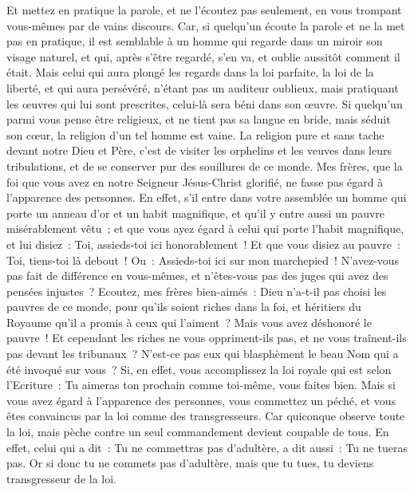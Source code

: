 \begin{multicols}{2}
Et mettez en pratique la parole, et ne l'écoutez pas seulement, en vous trompant vous-mêmes par de vains discours.
Car, si quelqu'un écoute la parole et ne la met pas en pratique, il est semblable à un homme qui regarde dans un miroir son visage naturel,
et qui, après s'être regardé, s'en va, et oublie aussitôt comment il était.
Mais celui qui aura plongé les regards dans la loi parfaite, la loi de la liberté, et qui aura persévéré, n'étant pas un auditeur oublieux, mais pratiquant les œuvres qui lui sont prescrites, celui-là sera béni dans son œuvre.
Si quelqu'un parmi vous pense être religieux, et ne tient pas sa langue en bride, mais séduit son cœur, la religion d'un tel homme est vaine.
La religion pure et sans tache devant notre Dieu et Père, c'est de visiter les orphelins et les veuves dans leurs tribulations, et de se conserver pur des souillures de ce monde.
\VerseOne{}Mes frères, que la foi que vous avez en notre Seigneur Jésus-Christ glorifié, ne fasse pas égard à l'apparence des personnes.
En effet, s'il entre dans votre assemblée un homme qui porte un anneau d'or et un habit magnifique, et qu'il y entre aussi un pauvre misérablement vêtu~;
et que vous ayez égard à celui qui porte l'habit magnifique, et lui disiez~: Toi, assieds-toi ici honorablement~! Et que vous disiez au pauvre~: Toi, tiens-toi là debout~! Ou~: Assieds-toi ici sur mon marchepied~!
N'avez-vous pas fait de différence en vous-mêmes, et n'êtes-vous pas des juges qui avez des pensées injustes~?
Ecoutez, mes frères bien-aimés~: Dieu n'a-t-il pas choisi les pauvres de ce monde, pour qu'ils soient riches dans la foi, et héritiers du Royaume qu'il a promis à ceux qui l'aiment~?
Mais vous avez déshonoré le pauvre~! Et cependant les riches ne vous oppriment-ils pas, et ne vous traînent-ils pas devant les tribunaux~?
N'est-ce pas eux qui blasphèment le beau Nom qui a été invoqué sur vous~?
Si, en effet, vous accomplissez la loi royale qui est selon l'Ecriture~: Tu aimeras ton prochain comme toi-même, vous faites bien.
Mais si vous avez égard à l'apparence des personnes, vous commettez un péché, et vous êtes convaincus par la loi comme des transgresseurs.
Car quiconque observe toute la loi, mais pèche contre un seul commandement devient coupable de tous.
En effet, celui qui a dit~: Tu ne commettras pas d'adultère, a dit aussi~: Tu ne tueras pas. Or si donc tu ne commets pas d'adultère, mais que tu tues, tu deviens transgresseur de la loi.

\end{multicols}
